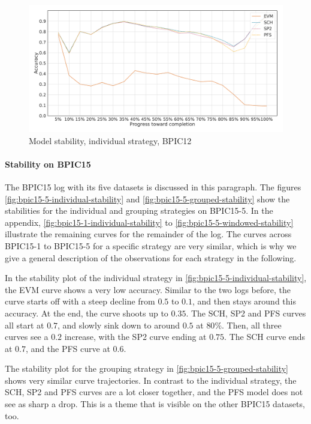 \begin{figure}[!htb]
    \centering
    \includegraphics[width=\textwidth]{gfx/bpic2012/individual_stability.pdf}
    \caption{Model stability, individual strategy, BPIC12}
    \label{fig:bpic12-individual-stability}
\end{figure}

\paragraph{Stability on BPIC15}
The BPIC15 log with its five datasets is discussed in this paragraph.
The figures \autoref{fig:bpic15-5-individual-stability} and \autoref{fig:bpic15-5-grouped-stability} show the stabilities for the individual and grouping strategies on BPIC15-5.
In the appendix, \autoref{fig:bpic15-1-individual-stability} to \autoref{fig:bpic15-5-windowed-stability} illustrate the remaining curves for the remainder of the log.
The curves across BPIC15-1 to BPIC15-5 for a specific strategy are very similar, which is why we give a general description of the observations for each strategy in the following.

In the stability plot of the individual strategy in \autoref{fig:bpic15-5-individual-stability}, the EVM curve shows a very low accuracy.
Similar to the two logs before, the curve starts off with a steep decline from $0.5$ to $0.1$, and then stays around this accuracy. At the end, the curve shoots up to $0.35$.
The SCH, SP2 and PFS curves all start at $0.7$, and slowly sink down to around $0.5$ at $80\%$.
Then, all three curves see a $0.2$ increase, with the SP2 curve ending at $0.75$.
The SCH curve ends at $0.7$, and the PFS curve at $0.6$.

The stability plot for the grouping strategy in \autoref{fig:bpic15-5-grouped-stability} shows very similar curve trajectories.
In contrast to the individual strategy, the SCH, SP2 and PFS curves are a lot closer together, and the PFS model does not see as sharp a drop.
This is a theme that is visible on the other BPIC15 datasets, too.

